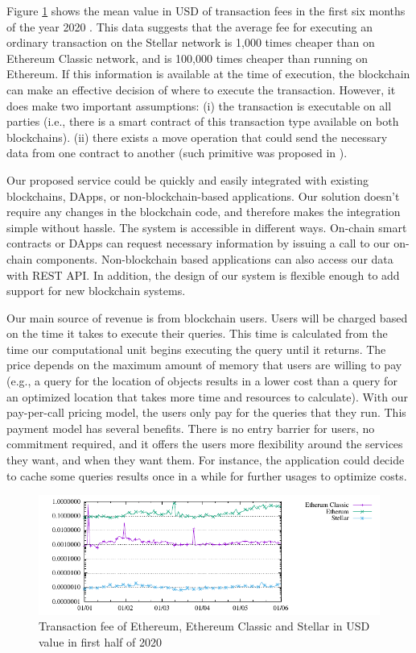 Figure \ref{fig:transaction-fee} shows the mean value in USD of transaction
fees in the first six months of the year 2020 \cite{transactionfee}. This data
suggests that the average fee for executing an ordinary transaction on the Stellar
network is 1,000 times cheaper than on Ethereum Classic network, and is 100,000
times cheaper than running on Ethereum. If this information is available at the
time of execution, the blockchain can make an effective decision of where to
execute the transaction. However, it does make two important assumptions: (i)
the transaction is executable on all parties (i.e., there is a smart contract of
this transaction type available on both blockchains). (ii) there exists a move
operation that could send the necessary data from one contract to another (such
primitive was proposed in \cite{fynn2020move}).

Our proposed service could be quickly and easily integrated with existing
blockchains, DApps, or non-blockchain-based applications. Our solution doesn't
require any changes in the blockchain code, and therefore makes the integration simple without
hassle. The system is accessible in different ways. On-chain smart contracts or
DApps can request necessary information by issuing a call to our on-chain
components. Non-blockchain based applications can also access our data with
REST API. In addition, the design of our system is flexible enough to add
support for new blockchain systems.

Our main source of revenue is from blockchain users. Users will be
charged based on the time it takes to execute their queries. This time is
calculated from the time our computational unit begins executing the query until
it returns. The price depends on the maximum amount of memory that users are
willing to pay (e.g., a query for the location of objects results in
a lower cost than a query for an optimized location that takes more time and
resources to calculate). With our pay-per-call pricing model, the users only pay
for the queries that they run. This payment model has several benefits. There is
no entry barrier for users, no commitment required, and it offers the users
more flexibility around the services they want, and when they want them. For
instance, the application could decide to cache some queries results once in a
while for further usages to optimize costs.


\begin{figure}[ht!]
\begin{minipage}[b]{1\linewidth}
\centering
      \includegraphics[width=0.6\linewidth]{figures/transaction-fee-mean-usd}
\end{minipage}
\caption{Transaction fee of Ethereum, Ethereum Classic and Stellar in USD value in first half of 2020}
\label{fig:transaction-fee}
\end{figure}

